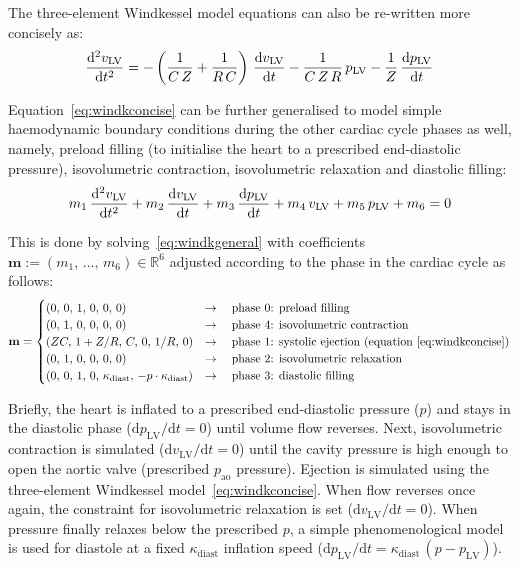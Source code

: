 \vspace{0.2cm}\noindent
The three-element Windkessel model equations can also be re-written more concisely as:
%
\begin{equation}\label{eq:windkconcise}
    \dfrac{\mathrm{d}^2{v_{\textrm{LV}}}}{\mathrm{d}{t}^2} = -\left(\frac{1}{C\,Z}+\frac{1}{R\,C}\right)\,\dfrac{\mathrm{d}{v_{\textrm{LV}}}}{\mathrm{d}{t}}-\frac{1}{C\,Z\,R}\,p_{\textrm{LV}}-\frac{1}{Z}\,\dfrac{\mathrm{d}{p_{\textrm{LV}}}}{\mathrm{d}{t}}
\end{equation}

\vspace{0.2cm}
Equation~\eqref{eq:windkconcise} can be further generalised to model simple haemodynamic boundary conditions during the other cardiac cycle phases as well, namely, preload filling (to initialise the heart to a prescribed end-diastolic pressure), isovolumetric contraction, isovolumetric relaxation and diastolic filling:
%
\begin{equation}\label{eq:windkgeneral}
    m_1\,\dfrac{\mathrm{d}^2{v_{\textrm{LV}}}}{\mathrm{d}{t}^2} + m_2\,\dfrac{\mathrm{d}{v_{\textrm{LV}}}}{\mathrm{d}{t}} + m_3\,\dfrac{\mathrm{d}{p_{\textrm{LV}}}}{\mathrm{d}{t}} + m_4\,v_{\textrm{LV}} + m_5\,p_{\textrm{LV}} +  m_6 = 0
\end{equation}

\noindent
This is done by solving~\eqref{eq:windkgeneral} with coefficients  $\mathbf{m}:=(m_1,\,\dots,\,m_6)\in\mathbb{R}^6$ adjusted according to the phase in the cardiac cycle as follows:
%
\begin{equation}
    \mathbf{m} = \begin{cases}
    (0,\,0,\,1,\,0,\,0,\,0) & \rightarrow\quad\text{phase $0$: preload filling} \\
    (0,\,1,\,0,\,0,\,0,\,0) & \rightarrow\quad\text{phase $4$: isovolumetric contraction} \\
    (ZC,\,1+Z/R,\,C,\,0,\,1/R,\,0) & \rightarrow\quad\text{phase $1$: systolic ejection (equation~\eqref{eq:windkconcise})} \\
    (0,\,1,\,0,\,0,\,0,\,0) & \rightarrow\quad\text{phase $2$: isovolumetric relaxation} \\
    (0,\,0,\,1,\,0,\,\kappa_{\textrm{diast}},\,-p\cdot \kappa_{\textrm{diast}}) & \rightarrow\quad\text{phase $3$: diastolic filling}
    \end{cases}
\end{equation}

\noindent
Briefly, the heart is inflated to a prescribed end-diastolic pressure ($p$) and stays in the diastolic phase ($\textrm{d}p_{\textrm{LV}}/\textrm{d}t=0$) until volume flow reverses. Next, isovolumetric contraction is simulated ($\textrm{d}v_{\textrm{LV}}/\textrm{d}t=0$) until the cavity pressure is high enough to open the aortic valve (prescribed $p_{\textrm{ao}}$ pressure). Ejection is simulated using the three-element Windkessel model~\eqref{eq:windkconcise}. When flow reverses once again, the constraint for isovolumetric relaxation is set ($\textrm{d}v_{\textrm{LV}}/\textrm{d}t=0$). When pressure finally relaxes below the prescribed $p$, a simple phenomenological model is used for diastole at a fixed $\kappa_{\textrm{diast}}$ inflation speed ($\textrm{d}p_{\textrm{LV}}/\textrm{d}t=\kappa_{\textrm{diast}}\,(p - p_{\textrm{LV}})$).


